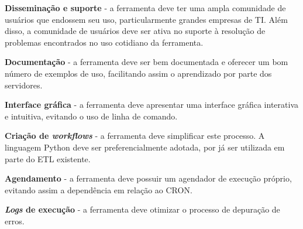 \textbf{Disseminação e suporte} - a ferramenta deve ter uma ampla comunidade de usuários que endossem seu uso, particularmente grandes empresas de TI. Além disso, a comunidade de usuários deve ser ativa no suporte à resolução de problemas encontrados no uso cotidiano da ferramenta.

\textbf{Documentação} - a ferramenta deve ser bem documentada e oferecer um bom número de exemplos de uso, facilitando assim o aprendizado por parte dos servidores.

\textbf{Interface gráfica} - a ferramenta deve apresentar uma interface gráfica interativa e intuitiva, evitando o uso de linha de comando. 

\textbf{Criação de \textit{workflows}} - a ferramenta deve simplificar este processo.
A linguagem Python deve ser preferencialmente adotada, por já ser utilizada em parte do ETL existente.


\textbf{Agendamento} - a ferramenta deve possuir um agendador de execução próprio, evitando assim a dependência em relação ao CRON.

\textbf{\textit{Logs} de execução} - a ferramenta deve otimizar o processo de depuração de erros.



